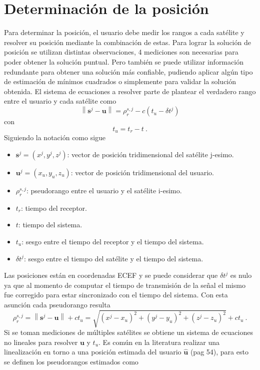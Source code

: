 \documentclass[a4paper,12pt,oneside,onecolumn,final,openright]{book}%
\begin{document}
\section{Determinación de la posición}
	Para determinar la posición, el usuario debe medir los rangos a cada satélite y resolver su posición mediante la combinación de estas. Para lograr la solución de posición se utilizan distintas observaciones, 4 mediciones son necesarias para poder obtener la solución puntual. Pero también se puede utilizar información redundante para obtener una solución más confiable, pudiendo aplicar algún tipo de estimación de mínimos cuadrados o simplemente para validar la solución obtenida. El sistema de ecuaciones a resolver parte de plantear el verdadero rango entre el usuario y cada satélite como 
\begin{equation}
	\left \lVert \mathbf{s}^j - \mathbf{u} \right \rVert = \rho_r^{s,j} - c(t_u-\delta t^j)
\end{equation}
	con 
\begin{equation}
	t_u = t_r - t \ .
\end{equation}
	Siguiendo la notación como sigue
\begin{itemize}
  \item[] $\mathbf{s}^j = (x^j,y^j,z^j)$: vector de posición tridimensional del satélite j-esimo.
  \item[] $\mathbf{u}^j = (x_u,y_u,z_u)$: vector de posición tridimensional del usuario.
  \item[] $\rho_r^{s,j}$: pseudorango entre el usuario y el satélite i-esimo.
  \item[] $t_r$: tiempo del receptor.
  \item[] $t$: tiempo del sistema.
  \item[] $t_u$: sesgo entre el tiempo del receptor y el tiempo del sistema.
  \item[] $\delta t^j$: sesgo entre el tiempo del satélite y el tiempo del sistema.
\end{itemize}
	Las posiciones están en coordenadas ECEF y se puede considerar que $\delta t^j$ es nulo ya que al momento de computar el tiempo de transmisión de la señal el mismo fue corregido para estar sincronizado con el tiempo del sistema. Con esta asunción cada pseudorango resulta
\begin{equation}
	\rho_r^{s,j} = \left \lVert \mathbf{s}^j - \mathbf{u} \right \rVert + ct_u = \sqrt{(x^j-x_u)^2+(y^j-y_u)^2+(z^j-z_u)^2} + ct_u \ .
\end{equation} 
	Si se toman mediciones de múltiples satélites se obtiene un sistema de ecuaciones no lineales para resolver $\mathbf{u}$ y $t_u$. Es común en la literatura realizar una linealización en torno a una posición estimada del usuario $\hat{\mathbf{u}}$ \cite{Kaplan}(pag 54), para esto se definen los pseudorangos estimados como
\end{document}
